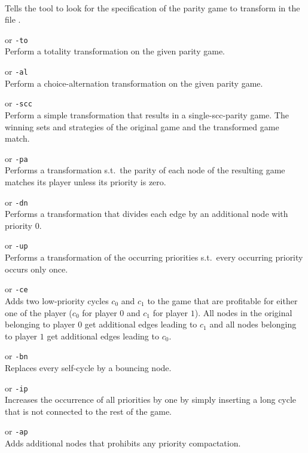 \begin{description}
\itemsep3mm
\item[\nonterminal{filename}] \ \\
   Tells the tool to look for the specification of the parity game to transform in the file
   .

\item[{\tt --total}] \enspace or {\tt -to} \\
   Perform a totality transformation on the given parity game.

\item[{\tt --alternating}] \enspace or {\tt -al} \\
   Perform a choice-alternation transformation on the given parity game.

 \item[{\tt --singlescc}] \enspace or {\tt -scc} \\
   Perform a simple transformation that results in a single-scc-parity game. The winning sets and
   strategies of the original game and the transformed game match.

 \item[{\tt --prioalignment}] \enspace or {\tt -pa} \\
   Performs a transformation s.t.\ the parity of each node of the resulting game matches its player
   unless its priority is zero.

\item[{\tt --dummynodes}] \enspace or {\tt -dn} \\
   Performs a transformation that divides each edge by an additional node with priority $0$.

\item[{\tt --uniquizeprios}] \enspace or {\tt -up} \\
   Performs a transformation of the occurring priorities s.t.\ every occurring priority occurs only once.

 \item[{\tt --cheapescapecycles}] \enspace or {\tt -ce} \\
   Adds two low-priority cycles $c_0$ and $c_1$ to the game that are profitable for either one of the
   player ($c_0$ for player $0$ and $c_1$ for player $1$). All nodes in the original belonging to
   player $0$ get additional edges leading to $c_1$ and all nodes belonging to player $1$ get
   additional edges leading to $c_0$.

\item[{\tt --bouncingnode}] \enspace or {\tt -bn} \\
   Replaces every self-cycle by a bouncing node.

 \item[{\tt --increasepriorityoccurrence}] \enspace or {\tt -ip} \\
   Increases the occurrence of all priorities by one by simply inserting a long cycle that is not
   connected to the rest of the game.

\item[{\tt --antiprioritycompactation}] \enspace or {\tt -ap} \\
   Adds additional nodes that prohibits any priority compactation.
\end{description}

